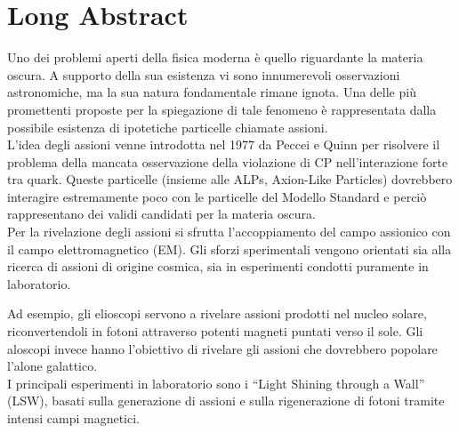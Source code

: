 \section*{Long Abstract}
Uno dei problemi aperti della fisica moderna è quello riguardante la materia oscura. A supporto della sua esistenza vi sono innumerevoli osservazioni astronomiche, ma la sua natura fondamentale rimane ignota. Una delle più promettenti proposte per la spiegazione di tale fenomeno è rappresentata dalla possibile esistenza di ipotetiche particelle chiamate assioni.\\ %

L’idea degli assioni venne introdotta nel 1977 da Peccei e Quinn per risolvere il problema della mancata osservazione della violazione di CP nell'interazione forte tra quark. Queste particelle (insieme alle ALPs, Axion-Like Particles) dovrebbero interagire estremamente poco con le particelle del Modello Standard e perciò rappresentano dei validi candidati per la materia oscura.\\ 


Per la rivelazione degli assioni si sfrutta l’accoppiamento del campo assionico con il campo elettromagnetico (EM). Gli sforzi sperimentali vengono orientati sia alla ricerca di assioni di origine cosmica, sia in esperimenti condotti puramente in laboratorio.



Ad esempio, gli elioscopi servono a rivelare assioni prodotti nel nucleo solare, riconvertendoli in fotoni attraverso potenti magneti puntati verso il sole. Gli aloscopi invece hanno l'obiettivo di rivelare gli assioni che dovrebbero popolare l’alone galattico.\\
I principali esperimenti in laboratorio sono i “Light Shining through a Wall” (LSW), basati sulla generazione di assioni e sulla rigenerazione di fotoni tramite intensi campi magnetici. \\

